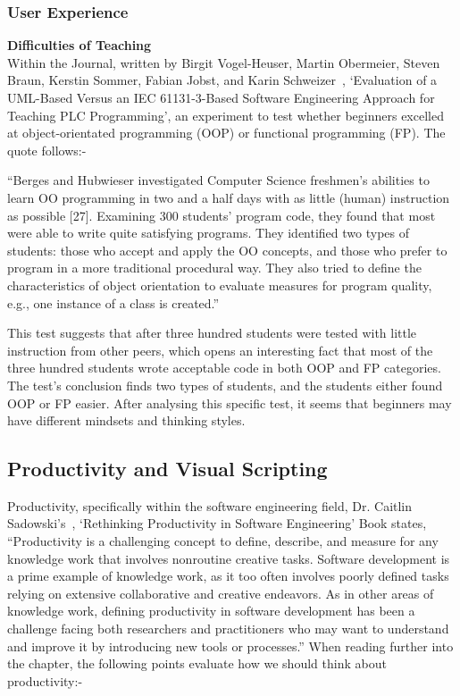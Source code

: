 \documentclass[conference]{IEEEtran}
\begin{document}
        \subsubsection{User Experience}
          \textbf{Difficulties of Teaching}\\
            Within the Journal, written by Birgit Vogel-Heuser, Martin Obermeier, Steven Braun, Kerstin Sommer, Fabian Jobst, and Karin Schweizer~\cite{vogel-heuser_evaluation_2013}, `Evaluation of a UML-Based Versus an IEC 61131-3-Based Software Engineering Approach for Teaching PLC Programming', an experiment to test whether beginners excelled at object-orientated programming (OOP) or functional programming (FP). The quote follows:-

            \begin{center}
              ``Berges and Hubwieser investigated Computer Science
              freshmen’s abilities to learn OO programming in two and a
              half days with as little (human) instruction as possible [27].
              Examining 300 students’ program code, they found that most
              were able to write quite satisfying programs. They identified
              two types of students: those who accept and apply the OO
              concepts, and those who prefer to program in a more traditional
              procedural way. They also tried to define the characteristics of
              object orientation to evaluate measures for program quality,
              e.g., one instance of a class is created.''~\cite{vogel-heuser_evaluation_2013}
            \end{center}

            This test suggests that after three hundred students were tested with little instruction from other peers, which opens an interesting fact that most of the three hundred students wrote acceptable code in both OOP and FP categories. The test's conclusion finds two types of students, and the students either found OOP or FP easier. After analysing this specific test, it seems that beginners may have different mindsets and thinking styles.
   
        
      \subsection{Productivity and Visual Scripting}
      Productivity, specifically within the software engineering field, Dr. Caitlin Sadowski's~\cite{dr_caitlin_sadowski_rethinking_2019}, `Rethinking Productivity in Software Engineering' Book states, ``Productivity is a challenging concept to define, describe, and measure for any knowledge work that involves nonroutine creative tasks. Software development is a prime example of knowledge work, as it too often involves poorly defined tasks relying on extensive collaborative and creative endeavors. As in other areas of knowledge work, defining productivity in software development has been a challenge facing both researchers and practitioners who may want to understand and improve it by introducing new tools or processes.'' When reading further into the chapter, the following points evaluate how we should think about productivity:-
\end{document}
